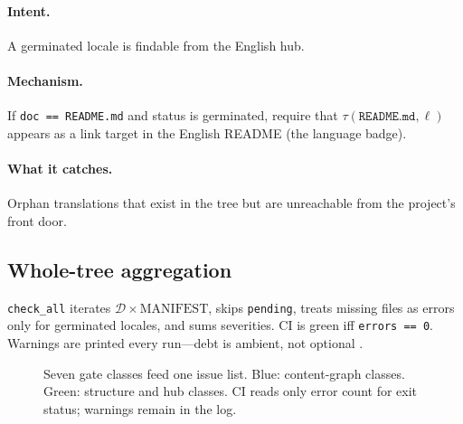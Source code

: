 \documentclass[11pt]{article}
\theoremstyle{definition}
\theoremstyle{plain}
\theoremstyle{remark}
\begin{document}
\paragraph{Intent.} A germinated locale is findable from the English hub.

\paragraph{Mechanism.} If \texttt{doc == README.md} and status is
germinated, require that $\tau(\texttt{README.md}, \ell)$ appears as a link
target in the English README (the language badge).

\paragraph{What it catches.} Orphan translations that exist in the tree but
are unreachable from the project's front door.

\subsection{Whole-tree aggregation}

\texttt{check\_all} iterates $\mathcal{D} \times \mathrm{MANIFEST}$, skips
\texttt{pending}, treats missing files as errors only for germinated
locales, and sums severities. CI is green iff \texttt{errors == 0}. Warnings
are printed every run---debt is ambient, not optional
\citep{hermesspec}.

\begin{figure}[H]
\centering
{}
\caption{Seven gate classes feed one issue list. Blue: content-graph
classes. Green: structure and hub classes. CI reads only error count for
exit status; warnings remain in the log.}
\label{fig:gate-classes}
\end{figure}
\end{document}
